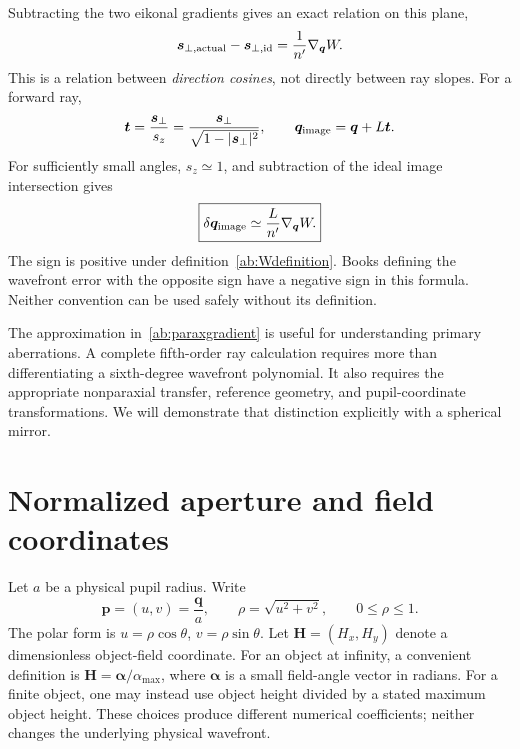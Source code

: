 Subtracting the two eikonal gradients gives an exact relation on this plane,
\begin{equation}
 \bm s_{\perp,\rm actual}-\bm s_{\perp,\rm id}
       =\frac{1}{n'}\nabla_{\bm q}W.
 \label{ab:directiongradient}
\end{equation}
This is a relation between \emph{direction cosines}, not directly between ray
slopes. For a forward ray,
\begin{equation}
 \bm t=\frac{\bm s_\perp}{s_z}
       =\frac{\bm s_\perp}{\sqrt{1-|\bm s_\perp|^2}},
 \qquad \bm q_{\rm image}=\bm q+L\bm t.
 \label{ab:exacttransfer}
\end{equation}
For sufficiently small angles, $s_z\simeq1$, and subtraction of the ideal
image intersection gives
\begin{equation}
 \boxed{\delta\bm q_{\rm image}\simeq
          \frac{L}{n'}\nabla_{\bm q}W.}
 \label{ab:paraxgradient}
\end{equation}
The sign is positive under definition~\eqref{ab:Wdefinition}. Books defining
the wavefront error with the opposite sign have a negative sign in this
formula. Neither convention can be used safely without its definition.

The approximation in~\eqref{ab:paraxgradient} is useful for understanding
primary aberrations. A complete fifth-order ray calculation requires more
than differentiating a sixth-degree wavefront polynomial. It also requires
the appropriate nonparaxial transfer, reference geometry, and pupil-coordinate
transformations. We will demonstrate that distinction explicitly with a
spherical mirror.

\section{Normalized aperture and field coordinates}
Let $a$ be a physical pupil radius. Write
\begin{equation}
 \bm p=(u,v)=\frac{\bm q}{a},\qquad
 \rho=\sqrt{u^2+v^2},\qquad 0\leq\rho\leq1.
\end{equation}
The polar form is $u=\rho\cos\theta$, $v=\rho\sin\theta$. Let
$\bm H=(H_x,H_y)$ denote a dimensionless object-field coordinate. For an
object at infinity, a convenient definition is
$\bm H=\bm\alpha/\alpha_{\max}$, where $\bm\alpha$ is a small field-angle
vector in radians. For a finite object, one may instead use object height
divided by a stated maximum object height. These choices produce different
numerical coefficients; neither changes the underlying physical wavefront.


